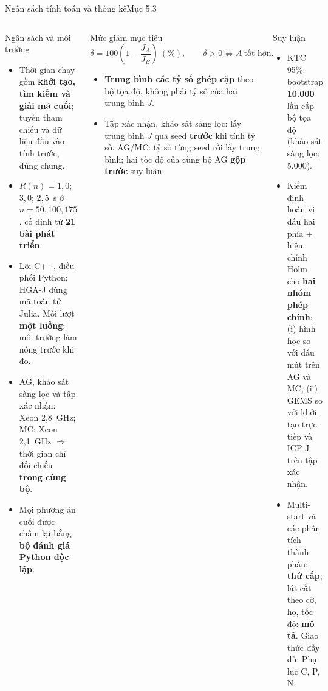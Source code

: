\documentclass[aspectratio=169,10pt,t,xcolor={table}]{beamer}
\newcommand{\src}[1]{\hfill{\normalfont\footnotesize\color{white!62!navy}#1}}  %
\begin{document}
\begin{frame}{Ngân sách tính toán và thống kê\src{Mục 5.3}}
\begin{columns}[T,onlytextwidth]
\begin{block}{Ngân sách và môi trường}
\scriptsize
\begin{itemize}
\item Thời gian chạy gồm \textbf{khởi tạo, tìm kiếm và giải mã cuối}; tuyến tham chiếu và dữ liệu đầu vào tính trước, dùng chung.
\item $R(n)=1{,}0$; $3{,}0$; $2{,}5$~s ở $n=50,100,175$, cố định từ \textbf{21 bài phát triển}.
\item Lõi C++, điều phối Python; HGA-J dùng mã toán tử Julia. Mỗi lượt \textbf{một luồng}; môi trường làm nóng trước khi đo.
\item AG, khảo sát sàng lọc và tập xác nhận: Xeon 2,8~GHz; MC: Xeon 2,1~GHz $\Rightarrow$ thời gian chỉ đối chiếu \textbf{trong cùng bộ}.
\item Mọi phương án cuối được chấm lại bằng \textbf{bộ đánh giá Python độc lập}.
\end{itemize}
\end{block}
\begin{block}{Mức giảm mục tiêu}
\scriptsize
\begin{equation}\tag{8}
\delta=100\left(1-\frac{J_A}{J_B}\right)\ (\%),\qquad \delta>0\Leftrightarrow A\ \text{tốt hơn}.
\end{equation}
\vspace{-6pt}
\begin{itemize}
\item \textbf{Trung bình các tỷ số ghép cặp} theo bộ tọa độ, không phải tỷ số của hai trung bình $J$.
\item Tập xác nhận, khảo sát sàng lọc: lấy trung bình $J$ qua seed \textbf{trước} khi tính tỷ số. AG/MC: tỷ số từng seed rồi lấy trung bình; hai tốc độ của cùng bộ AG \textbf{gộp trước} suy luận.
\end{itemize}
\end{block}
\begin{block}{Suy luận}
\scriptsize
\begin{itemize}
\item KTC 95\%: bootstrap \textbf{10.000} lần cấp bộ tọa độ~\cite{efron1979} (khảo sát sàng lọc: 5.000).
\item Kiểm định hoán vị dấu hai phía + hiệu chỉnh Holm~\cite{holm1979} cho \textbf{hai nhóm phép chính}: (i) hình học so với đầu mút trên AG và MC; (ii) GEMS so với khởi tạo trực tiếp và ICP-J trên tập xác nhận.
\item Multi-start và các phân tích thành phần: \textbf{thứ cấp}; lát cắt theo cỡ, họ, tốc độ: \textbf{mô tả}. Giao thức đầy đủ: Phụ lục C, P, N.
\end{itemize}
\end{block}
\end{columns}
\end{frame}
\end{document}

